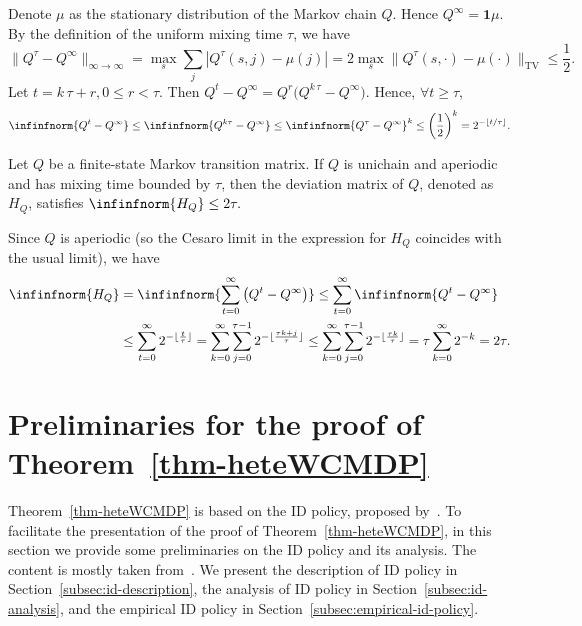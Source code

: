 \documentclass[mnsc,nonblindrev]{informs3}
\newcommand{\one}{\mathbf{1}}
\begin{document}
\begin{APPENDICES}
    Denote $\mu$ as the stationary distribution of the Markov chain $Q$. Hence $Q^\infty=\one\mu$. By the definition of the uniform mixing time $\tau$, we have
\[
\|Q^{\tau} - Q^\infty\|_{\infty\to\infty}=\max_{s}\sum_{j}|Q^{\tau}(s,j)-\mu(j)|=2\max_s\|Q^{\tau}(s,\cdot)-\mu(\cdot)\|_{\text{TV}}  \le \frac12.
\]
Let \(
t = k\,\tau + r, 0 \le r < \tau.
\) Then
\(
Q^t - Q^\infty
= Q^r \bigl(Q^{k\,\tau} - Q^\infty\bigr).
\) Hence, $\forall t\ge\tau$,
\[
\infinfnorm{Q^t - Q^\infty}\le\infinfnorm{Q^{k\tau} - Q^\infty}\le\infinfnorm{Q^{\tau} - Q^\infty}^k\le\left(\frac{1}{2}\right)^k=2^{-\lfloor t/\tau\rfloor}.
\]
\endproof
\begin{lemma}
\label{lem:deviation_mtx_mixing_bound}
    Let \(Q\) be a finite-state Markov transition matrix. If \(Q\) is
    unichain and aperiodic and has mixing time bounded by \(\tau\), then
    the deviation matrix of \(Q\), denoted as \(H_Q\), satisfies
    $
        \infinfnorm{H_Q} \leq 2\tau.
    $
\end{lemma}
    Since \(Q\) is aperiodic (so the Cesaro limit in the expression for
    \(H_Q\) coincides with the usual limit), we have
    \begin{align*}
        \infinfnorm{H_Q}
        &= \infinfnorm{\sum_{t=0}^\infty \left( Q^{t} - Q^{\infty}\right)}
        \leq \sum_{t=0}^\infty \infinfnorm{ Q^{t} - Q^{\infty}}\\
        & \leq \sum_{t=0}^\infty  2^{-\lfloor\frac{t}{\tau}\rfloor}
        = \sum_{k=0}^\infty \sum_{j=0}^{\tau - 1}
        2^{-\lfloor\frac{\tau k + j}{\tau}\rfloor}
        \leq \sum_{k=0}^\infty \sum_{j=0}^{\tau - 1}
        2^{-\lfloor\frac{\tau k}{\tau}\rfloor}
        = \tau \sum_{k=0}^\infty 2^{-k}
        = 2 \tau.
    \end{align*}
\endproof
\section{Preliminaries for the proof of Theorem~\ref{thm-heteWCMDP}}\label{sec:preliminary-thm-hete}

Theorem~\ref{thm-heteWCMDP} is based on the ID policy, proposed by~\citet{zhang2025projection}. To facilitate the presentation of the proof of Theorem~\ref{thm-heteWCMDP},  in this section we provide some preliminaries on the ID policy and its analysis. The content is mostly taken from~\citet{zhang2025projection}. We present the description of ID policy in Section~\ref{subsec:id-description}, the analysis of ID policy in Section~\ref{subsec:id-analysis}, and the empirical ID policy in Section~\ref{subsec:empirical-id-policy}.



\end{APPENDICES}
\end{document}

